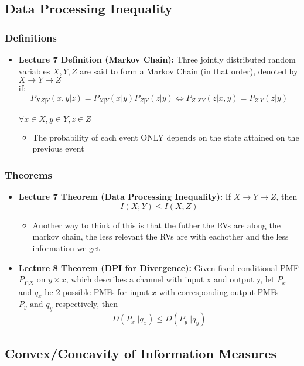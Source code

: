 \documentclass{article}
\begin{document}
\subsection{Data Processing Inequality}
\subsubsection{Definitions}
\begin{itemize}
    \item \textbf{Lecture 7 Definition (Markov Chain):} Three jointly distributed random variables \(X,Y,Z\) are said to form a Markov Chain (in that order), denoted by \(X \to Y \to Z\)
    \\if:
    \[P_{XZ|Y}(x,y|z) = P_{X|Y}(x|y) P_{Z|Y}(z|y) \Longleftrightarrow P_{Z|XY}(z|x,y) = P_{Z|Y}(z|y)\]
    \\ \(\forall x \in X, y \in Y, z \in Z\)
    \\
    \begin{itemize}
        \item The probability of each event ONLY depends on the state attained on the previous event
    \end{itemize}
\end{itemize}
\subsubsection{Theorems}
\begin{itemize}
    \item \textbf{Lecture 7 Theorem (Data Processing Inequality):} If \(X \to Y \to Z\), then 
    \[I(X;Y) \leq I(X;Z)\]
    \begin{itemize}
        \item Another way to think of this is that the futher the RVs are along the markov chain, the less relevant the RVs are with eachother and the less information we get
    \end{itemize}
    \item \textbf{Lecture 8 Theorem (DPI for Divergence):} Given fixed conditional PMF \(P_{Y|X}\) on \(y \times x\), which describes a channel with input x and output y,
    let \(P_x\) and \(q_x\) be 2 possible PMFs for input \(x\) with corresponding output PMFs \(P_y \text{ and } q_y\) respectively, then
    \[D(P_x||q_x) \leq D(P_y||q_y)\]
\end{itemize}

\subsection{Convex/Concavity of Information Measures}
\end{document}
